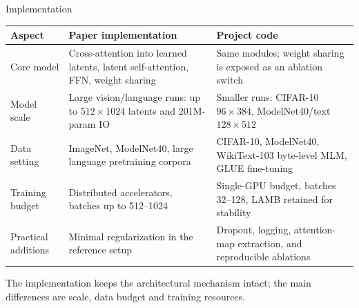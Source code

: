 \documentclass[aspectratio=169,11pt]{beamer}
\begin{document}
\begin{frame}[shrink=5]{Implementation}
  \vspace{0.15em}
  \begin{table}
    \centering\scriptsize
    \begin{tabular}{p{}p{}p{}}
      \toprule
      \textbf{Aspect} & \textbf{Paper implementation} & \textbf{Project code} \\
      \midrule
      Core model &
      Cross-attention into learned latents, latent self-attention, FFN, weight sharing &
      Same modules; weight sharing is exposed as an ablation switch \\
      \midrule
      Model scale &
      Large vision/language runs: up to $512{\times}1024$ latents and 201M-param IO &
      Smaller runs: CIFAR-10 $96{\times}384$, ModelNet40/text $128{\times}512$ \\
      \midrule
      Data setting &
      ImageNet, ModelNet40, large language pretraining corpora &
      CIFAR-10, ModelNet40, WikiText-103 byte-level MLM, GLUE fine-tuning \\
      \midrule
      Training budget &
      Distributed accelerators, batches up to 512--1024 &
      Single-GPU budget, batches 32--128, LAMB retained for stability \\
      \midrule
      Practical additions &
      Minimal regularization in the reference setup &
      Dropout, logging, attention-map extraction, and reproducible ablations \\
      \bottomrule
    \end{tabular}
  \end{table}

  \vspace{0.25em}
  {\small The implementation keeps the architectural mechanism intact; the main differences are scale, data budget and training resources.}
\end{frame}

\end{document}
